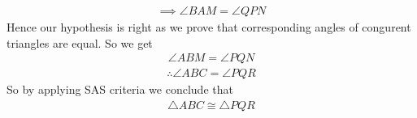 \documentclass[journal,12pt,twocolumn]{IEEEtran}
\begin{document}
\begin{align}
\implies \angle BAM = \angle QPN
\end{align}
Hence our hypothesis is right as we prove that corresponding angles of congurent triangles are equal. So we get 
\begin{align}
\angle ABM=\angle PQN    
\end{align}
\begin{align}
\therefore \angle ABC=\angle PQR    
\end{align}
So by applying SAS criteria we conclude that\\
\begin{align}
\triangle{ABC}\cong\triangle{PQR}
\end{align}
\end{document}
